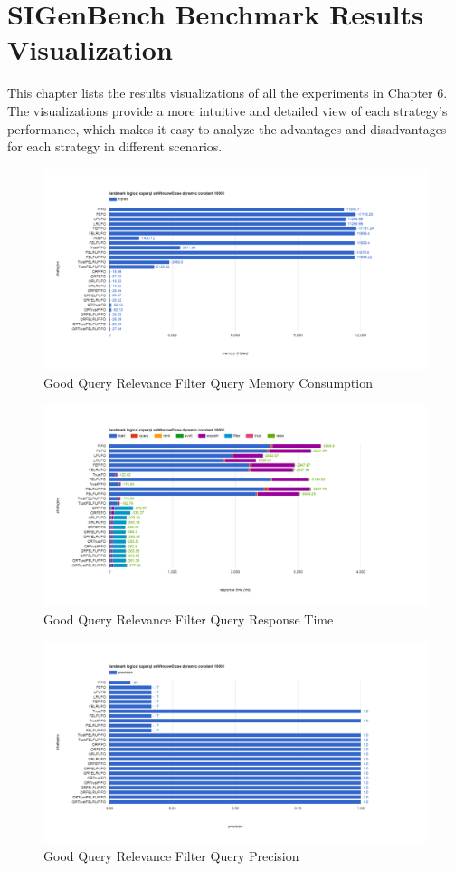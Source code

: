 \chapter{SIGenBench Benchmark Results Visualization}
This chapter lists the results visualizations of all the experiments in Chapter 6. 
The visualizations provide a more intuitive and detailed view of each strategy's performance, which makes it easy to analyze the advantages and disadvantages for each strategy in different scenarios. 
\begin{figure}[!htbp]
	\centering
    \includegraphics[width=6.5in]{img/app3-gqr-m.png}
    \caption{Good Query Relevance Filter Query Memory Consumption}
\end{figure}
\begin{figure}[!htbp]
	\centering
    \includegraphics[width=6.5in]{img/app3-gqr-r.png}
    \caption{Good Query Relevance Filter Query Response Time}
\end{figure}
\begin{figure}[!htbp]
	\centering
    \includegraphics[width=6.5in]{img/app3-gqr-p.png}
    \caption{Good Query Relevance Filter Query Precision}
\end{figure}
